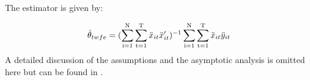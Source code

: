 The estimator is given by:

\begin{align}
 \hat{\theta}_{twfe} = (\operatorname*{\sum_{i=1}^N} \operatorname*{\sum_{t=1}^T} \ddot x_{it} \ddot x_{it}')^{-1} \operatorname*{\sum_{i=1}^N} \operatorname*{\sum_{t=1}^T}  \ddot x_{it} \ddot y_{it}
\end{align}
A detailed discussion of the assumptions and the asymptotic analysis is omitted here but can be found in \textcite{vogelsang2012heteroskedasticity}.